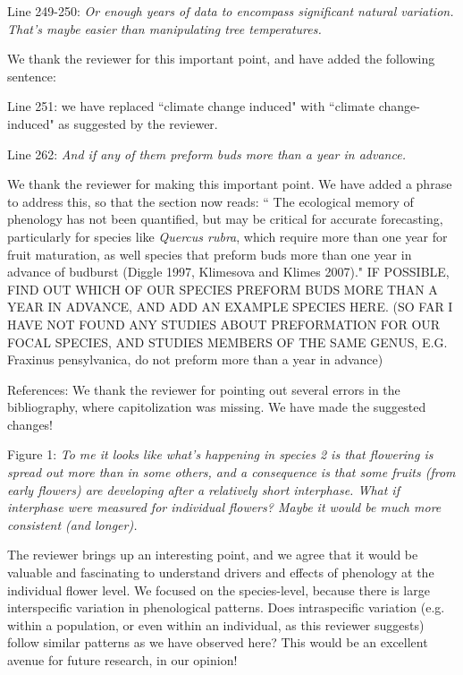 \documentclass[10.95pt,a4paper]{letter}
\begin{document}
\par Line 249-250: \emph{Or enough years of data to encompass significant natural variation.  That's maybe easier than manipulating tree temperatures.}
\par We thank the reviewer for this important point, and have added the following sentence:
\par Line 251: we have replaced ``climate change induced" with ``climate change-induced" as suggested by the reviewer.
\\
\par Line 262: \emph{And if any of them preform buds more than a year in advance.}
\par We thank the reviewer for making this important point. We have added a phrase to address this, so that the section now reads:
`` The ecological memory of phenology has not been quantified, but may be critical for accurate forecasting, particularly for species like \emph{Quercus rubra}, which require more than one year for fruit maturation, as well species that preform buds more than one year in advance of budburst (Diggle 1997, Klimesova and Klimes 2007)." IF POSSIBLE, FIND OUT WHICH OF OUR SPECIES PREFORM BUDS MORE THAN A YEAR IN ADVANCE, AND ADD AN EXAMPLE SPECIES HERE. (SO FAR I HAVE NOT FOUND ANY STUDIES ABOUT PREFORMATION FOR OUR FOCAL SPECIES, AND STUDIES MEMBERS OF THE SAME GENUS, E.G. Fraxinus pensylvanica, do not preform more than a year in advance)
\\
\par References: We thank the reviewer for pointing out several errors in the bibliography, where capitolization was missing. We have made the suggested changes!
\\
\par Figure 1: \emph{To me it looks like what's happening in species 2 is that flowering is spread out more than in some others, and a consequence is that some fruits (from early flowers) are developing after a relatively short interphase.  What if interphase were measured for individual flowers?  Maybe it would be much more consistent (and longer).}
\par The reviewer brings up an interesting point, and we agree that it would be valuable and fascinating to understand drivers and effects of phenology at the individual flower level. We focused on the species-level, because there is large interspecific variation in phenological patterns. Does intraspecific variation (e.g. within a population, or even within an individual, as this reviewer suggests) follow similar patterns as we have observed here? This would be an excellent avenue for future research, in our opinion!
\end{document}

